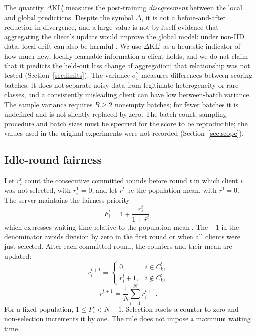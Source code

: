\documentclass[pdflatex,sn-basic]{sn-jnl}
\newcommand{\KL}{\Delta\mathrm{KL}}
\begin{document}
The quantity $\KL_i^t$ measures the post-training \emph{disagreement} between the local and global predictions. Despite the symbol $\Delta$, it is not a before-and-after reduction in divergence, and a large value is not by itself evidence that aggregating the client's update would improve the global model: under non-IID data, local drift can also be harmful \citep{li2020,wang2020}. We use $\KL_i^t$ as a heuristic indicator of how much new, locally learnable information a client holds, and we do not claim that it predicts the held-out loss change of aggregation; that relationship was not tested (Section~\ref{sec:limits}). The variance $\sigma_i^2$ measures differences between scoring batches. It does not separate noisy data from legitimate heterogeneity or rare classes, and a consistently misleading client can have low between-batch variance. The sample variance requires $B\ge 2$ nonempty batches; for fewer batches it is undefined and is not silently replaced by zero. The batch count, sampling procedure and batch sizes must be specified for the score to be reproducible; the values used in the original experiments were not recorded (Section~\ref{sec:scope}).

\subsection{Idle-round fairness}\label{sec4.3}
Let $r_i^t$ count the consecutive committed rounds before round $t$ in which client $i$ was not selected, with $r_i^1=0$, and let $\bar r^t$ be the population mean, with $\bar r^1=0$. The server maintains the fairness priority
\begin{equation}\label{eq:fair}
F_i^t=1+\frac{r_i^t}{1+\bar r^t},
\end{equation}
which expresses waiting time relative to the population mean \citep{xu2024}. The $+1$ in the denominator avoids division by zero in the first round or when all clients were just selected. After each committed round, the counters and their mean are updated:
\begin{equation}\label{eq:idle}
r_i^{t+1}=\begin{cases}0, & i\in C_k^t,\\ r_i^t+1, & i\notin C_k^t,\end{cases}
\end{equation}
\begin{equation}\label{eq:rbar}
\bar r^{t+1}=\frac{1}{N}\sum_{i=1}^{N}r_i^{t+1}.
\end{equation}
For a fixed population, $1\le F_i^t<N+1$. Selection resets a counter to zero and non-selection increments it by one. The rule does not impose a maximum waiting time.
\end{document}
